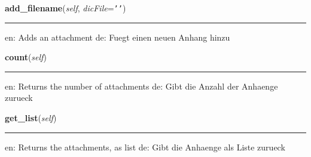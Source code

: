     \label{cuon:Email2:Attachments:add_filename}

    \vspace{0.5ex}

\hspace{.8\funcindent}\begin{boxedminipage}{\funcwidth}

    \raggedright \textbf{add\_filename}(\textit{self}, \textit{dicFile}={\tt \texttt{'}\texttt{}\texttt{'}})

    \vspace{-1.5ex}

    \rule{\textwidth}{0.5\fboxrule}
\setlength{\parskip}{2ex}
    en: Adds an attachment de: Fuegt einen neuen Anhang hinzu

\setlength{\parskip}{1ex}
    \end{boxedminipage}

    \label{cuon:Email2:Attachments:count}

    \vspace{0.5ex}

\hspace{.8\funcindent}\begin{boxedminipage}{\funcwidth}

    \raggedright \textbf{count}(\textit{self})

    \vspace{-1.5ex}

    \rule{\textwidth}{0.5\fboxrule}
\setlength{\parskip}{2ex}
    en: Returns the number of attachments de: Gibt die Anzahl der Anhaenge 
    zurueck

\setlength{\parskip}{1ex}
    \end{boxedminipage}

    \label{cuon:Email2:Attachments:get_list}

    \vspace{0.5ex}

\hspace{.8\funcindent}\begin{boxedminipage}{\funcwidth}

    \raggedright \textbf{get\_list}(\textit{self})

    \vspace{-1.5ex}

    \rule{\textwidth}{0.5\fboxrule}
\setlength{\parskip}{2ex}
    en: Returns the attachments, as list de: Gibt die Anhaenge als Liste 
    zurueck

\setlength{\parskip}{1ex}
    \end{boxedminipage}


